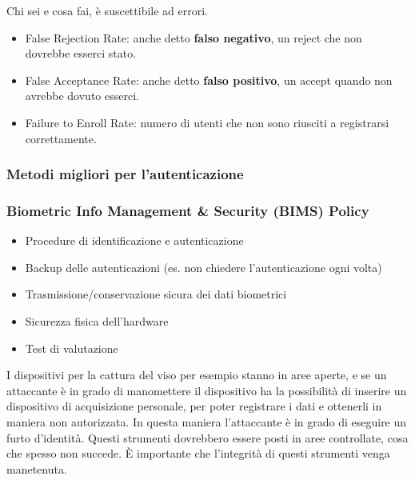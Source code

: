 Chi sei e cosa fai, è suscettibile ad errori.

\begin{itemize}
\item False Rejection Rate: anche detto \textbf{falso negativo}, un reject che
non dovrebbe esserci stato.
\item False Acceptance Rate: anche detto \textbf{falso positivo}, un accept
quando non avrebbe dovuto esserci.
\item Failure to Enroll Rate: numero di utenti che non sono riusciti a
registrarsi correttamente.
\end{itemize}

\subsubsection{Metodi migliori per l'autenticazione}


\subsubsection{Biometric Info Management \& Security (BIMS) Policy}

\begin{itemize}
 \item Procedure di identificazione e autenticazione
 \item Backup delle autenticazioni (es. non chiedere l'autenticazione ogni
 volta)
 \item Trasmissione/conservazione sicura dei dati biometrici
 \item Sicurezza fisica dell'hardware
 \item Test di valutazione
\end{itemize}

I dispositivi per la cattura del viso per esempio stanno in aree aperte, e se
un attaccante è in grado di manomettere il dispositivo ha la possibilità di
inserire un dispositivo di acquisizione personale, per poter registrare i dati
e ottenerli in maniera non autorizzata. In questa maniera l'attaccante è in
grado di eseguire un furto d'identità. Questi strumenti dovrebbero essere posti
in aree controllate, cosa che spesso non succede. È importante che l'integrità
di questi strumenti venga manetenuta.

